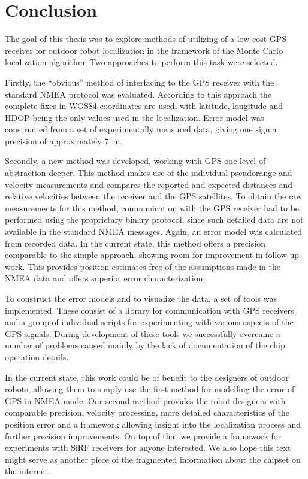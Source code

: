\chapter{Conclusion}
\label{chap:conclusion}

The goal of this thesis was to explore methods of utilizing of a low cost GPS receiver
for outdoor robot localization in the framework of the Monte Carlo localization algorithm.
Two approaches to perform this task were selected.

Firstly, the \enquote{obvious} method of interfacing to the GPS receiver with the
standard NMEA protocol was evaluated.
According to this approach the complete fixes in WGS84 coordinates are used,
with latitude, longitude and HDOP being the only values used in the localization.
Error model was constructed from a set of experimentally measured data,
giving one sigma precision of approximately \SI{7}{\meter}.

Secondly, a new method was developed, working with GPS one level of abstraction deeper.
This method makes use of the individual pseudorange and velocity measurements
and compares the reported and expected distances and relative velocities between
the receiver and the GPS satellites.
To obtain the raw measurements for this method, communication with the GPS
receiver had to be performed using the proprietary binary protocol,
since such detailed data are not available in the standard NMEA messages.
Again, an error model was calculated from recorded data.
In the current state, this method offers a precision comparable to the simple
approach, showing room for improvement in follow-up work.
This provides position estimates free of the assumptions made in the NMEA data
and offers superior error characterization.

To construct the error models and to visualize the data, a set of tools was implemented.
These consist of a library for communication with \sirf GPS receivers
and a group of individual scripts for experimenting with various aspects of the GPS signals.
During development of these tools we successfully overcame a number of problems caused mainly
by the lack of documentation of the \sirf chip operation details.

In the current state, this work could be of benefit to the designers of
outdoor robots, allowing them to simply use the first method for modelling the
error of GPS in NMEA mode.
Our second method provides the robot designers with comparable precision,
velocity processing, more detailed characteristics of the position error
and a framework allowing insight into the localization process and further
precision improvements.
On top of that we provide a framework for experiments with SiRF receivers
for anyone interested.
We also hope this text might serve as another piece of the fragmented
information about the \sirf chipset on the internet.
